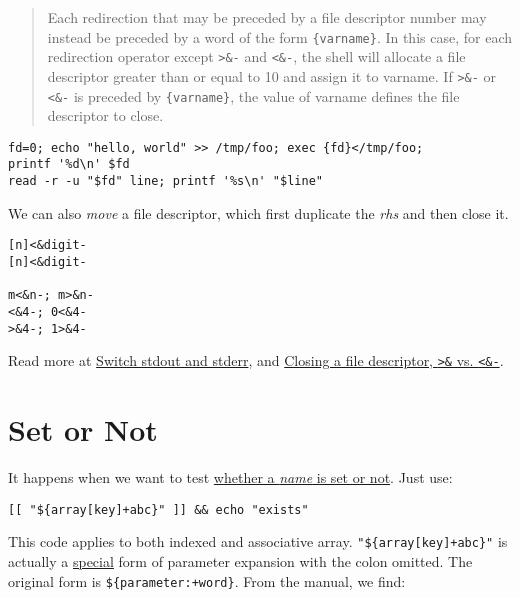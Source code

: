 \begin{quotation}
  Each redirection that may be preceded by a file descriptor
  number may instead be preceded by a word of the form
  \verb|{varname}|. In this case, for each redirection operator
  except \verb|>&-| and \verb|<&-|, the shell will allocate a file
  descriptor greater than or equal to 10 and assign it to varname.
  If \verb|>&-| or \verb|<&-| is preceded by \verb|{varname}|, the
  value of varname defines the file descriptor to close.
\end{quotation}

\begin{minipage}{1.0\linewidth}
\begin{lstlisting}
fd=0; echo "hello, world" >> /tmp/foo; exec {fd}</tmp/foo;
printf '%d\n' $fd
read -r -u "$fd" line; printf '%s\n' "$line"
\end{lstlisting}
\end{minipage}

We can also \textit{move} a file descriptor, which first duplicate
the \textit{rhs} and then close it.

\begin{lstlisting}
[n]<&digit-
[n]<&digit-

m<&n-; m>&n-
<&4-; 0<&4-
>&4-; 1>&4-
\end{lstlisting}

Read more at \href{https://unix.stackexchange.com/q/42728}{Switch
  stdout and stderr},
 and
\href{https://unix.stackexchange.com/q/131801}{Closing a file
  descriptor, \texttt{>\&} vs. \texttt{<\&-}}.

\section{Set or Not}
\label{sec:set-or-not}

It happens when we want to test
\href{https://stackoverflow.com/a/13221491}{whether a \textit{name}
  is set or not}. Just use:

\begin{lstlisting}
[[ "${array[key]+abc}" ]] && echo "exists"
\end{lstlisting}

This code applies to both indexed and associative
array. \lstinline|"${array[key]+abc}"| is actually a
\uline{special} form of parameter expansion with the colon
omitted. The original form is
\lstinline|${parameter:+word}|. From the manual, we find:

